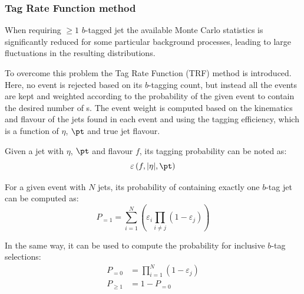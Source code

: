 \subsubsection{Tag Rate Function method}\label{sec:trf}

When requiring $\geq 1$ $b$-tagged jet the
available Monte Carlo statistics is significantly reduced for 
some particular background processes, leading to large
fluctuations in the resulting distributions.


To overcome this problem the Tag Rate Function (TRF) method is introduced.
Here, no event is rejected based on its $b$-tagging count, but instead all the events are 
kept and weighted according to the
probability of the given event to contain the desired number of \bjet s.
The event weight is computed based on the kinematics and flavour of the jets found in each event
and using the tagging efficiency, which is a function of $\eta$, $\pt$ and true jet flavour.

Given a jet with $\eta$, $\pt$ and flavour $f$, its tagging probability can be noted as:
\begin{equation*}
        \varepsilon \left(f,|\eta|,\pt\right)
\end{equation*}

For a given event with $N$ jets, its probability of containing exactly one $b$-tag jet can be computed as:
\begin{equation*}
        P_{=1} = \sum\limits_{i=1}^N \left( \varepsilon_{i} \prod\limits_{i \neq j} \left( 1 - \varepsilon_{j} \right) \right)
\end{equation*}

In the same way, it can be used to compute the probability for inclusive $b$-tag selections:
\begin{align*}
        P_{=0} &= \prod\limits_{i=1}^N \left( 1 - \varepsilon_{j} \right) \\
        P_{\geq 1} &= 1 - P_{=0}
\end{align*}


